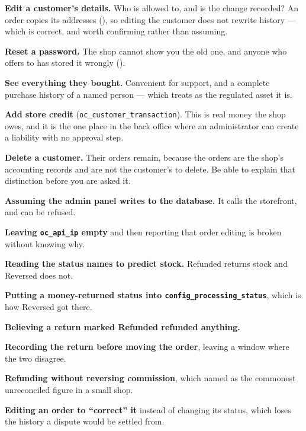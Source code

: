 \begin{examplebox}
\begin{tight}
  \item \textbf{Edit a customer's details.} Who is allowed to, and is the change
        recorded? An order copies its addresses (), so editing
        the customer does not rewrite history --- which is correct, and worth
        confirming rather than assuming.
  \item \textbf{Reset a password.} The shop cannot show you the old one, and
        anyone who offers to has stored it wrongly ().
  \item \textbf{See everything they bought.} Convenient for support, and a
        complete purchase history of a named person --- which
         treats as the regulated asset it is.
  \item \textbf{Add store credit} (\texttt{oc\_customer\_transaction}). This is
        real money the shop owes, and it is the one place in the back office
        where an administrator can create a liability with no approval step.
  \item \textbf{Delete a customer.} Their orders remain, because the orders are
        the shop's accounting records and are not the customer's to delete. Be
        able to explain that distinction before you are asked it.
\end{tight}
\end{examplebox}

\begin{pitfall}
\begin{tight}
  \item \textbf{Assuming the admin panel writes to the database.} It calls the
        storefront, and can be refused.
  \item \textbf{Leaving \texttt{oc\_api\_ip} empty} and then reporting that
        order editing is broken without knowing why.
  \item \textbf{Reading the status names to predict stock.} Refunded returns
        stock and Reversed does not.
  \item \textbf{Putting a money-returned status into
        \texttt{config\_processing\_status}}, which is how Reversed got there.
  \item \textbf{Believing a return marked Refunded refunded anything.}
  \item \textbf{Recording the return before moving the order}, leaving a window
        where the two disagree.
  \item \textbf{Refunding without reversing commission}, which
         named as the commonest unreconciled figure in a small
        shop.
  \item \textbf{Editing an order to ``correct'' it} instead of changing its
        status, which loses the history a dispute would be settled from.
\end{tight}
\end{pitfall}

